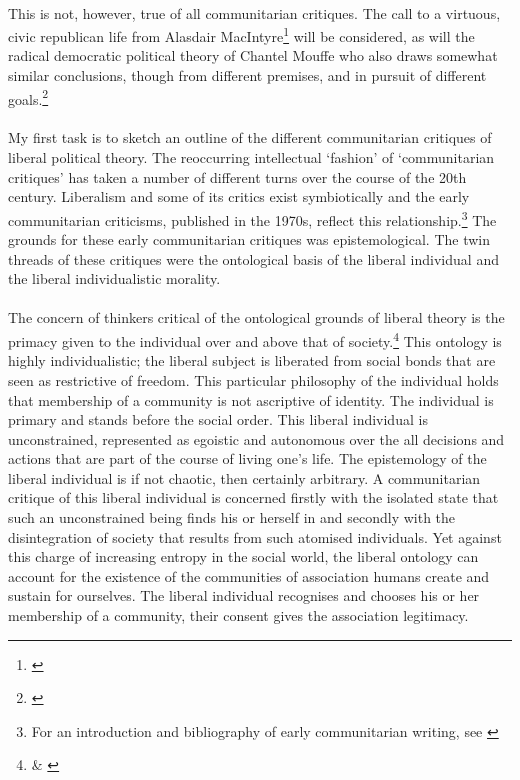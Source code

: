 \documentclass[12pt,a4paper,titlepage]{article}
\begin{document}
\paragraph{}This is not, however, true of all communitarian critiques. The call to a virtuous, civic republican life from Alasdair MacIntyre\footnote{\cite{MacIntyre:1981lr}} will be considered, as will the radical democratic political theory of Chantel Mouffe who also draws somewhat similar conclusions, though from different premises, and in pursuit of different goals.\footnote{\cite[Chapters 2, 3 \& 4]{mouffe:2005rp}}

\paragraph{}My first task is to sketch an outline of the different communitarian critiques of liberal political theory. The reoccurring intellectual `fashion' of `communitarian critiques' has taken a number of different turns over the course of the 20th century. Liberalism and some of its critics exist symbiotically and the early communitarian criticisms, published in the 1970s, reflect this relationship.\footnote{For an introduction and bibliography of early communitarian writing, see \cite[pp. 1-20, esp fn 14]{bell:1996cc}} The grounds for these early communitarian critiques was epistemological. The twin threads of these critiques were the ontological basis of the liberal individual and the liberal individualistic morality.

\paragraph{}The concern of thinkers critical of the ontological grounds of liberal theory is the primacy given to the individual over and above that of society.\footnote{\cite[Scene 1]{bell:1996cc} \& \cite[p. 8]{walzer:1990cc}} This ontology is highly individualistic; the liberal subject is liberated from social bonds that are seen as restrictive of freedom. This particular philosophy of the individual holds that membership of a community is not ascriptive of identity. The individual is primary and stands before the social order. This liberal individual is unconstrained, represented as egoistic and autonomous over the all decisions and actions that are part of the course of living one's life. The epistemology of the liberal individual is if not chaotic, then certainly arbitrary. A communitarian critique of this liberal individual is concerned firstly with the isolated state that such an unconstrained being finds his or herself in and secondly with the disintegration of society that results from such atomised individuals. Yet against this charge of increasing entropy in the social world, the liberal ontology can account for the existence of the communities of association humans create and sustain for ourselves. The liberal individual recognises and chooses his or her membership of a community, their consent gives the association legitimacy.
\end{document}
